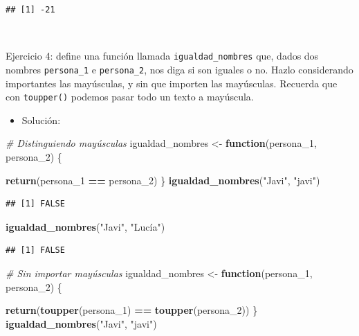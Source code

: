 \documentclass[11pt,]{book}
\newenvironment{Shaded}{\begin{snugshade}}{\end{snugshade}}
\newcommand{\CommentTok}[1]{\textcolor[rgb]{0.37,0.37,0.37}{\textit{#1}}}
\newcommand{\ControlFlowTok}[1]{\textcolor[rgb]{0.27,0.27,0.27}{\textbf{#1}}}
\newcommand{\DecValTok}[1]{\textcolor[rgb]{0.06,0.06,0.06}{#1}}
\newcommand{\KeywordTok}[1]{\textcolor[rgb]{0.27,0.27,0.27}{\textbf{#1}}}
\newcommand{\NormalTok}[1]{#1}
\newcommand{\OperatorTok}[1]{\textcolor[rgb]{0.43,0.43,0.43}{\textbf{#1}}}
\newcommand{\StringTok}[1]{\textcolor[rgb]{0.5,0.5,0.5}{#1}}
\providecommand{\tightlist}{%
  \setlength{\itemsep}{0pt}\setlength{\parskip}{0pt}}
\begin{document}
\begin{verbatim}
## [1] -21
\end{verbatim}

~

Ejercicio 4: define una función llamada \texttt{igualdad\_nombres} que, dados dos nombres \texttt{persona\_1} e \texttt{persona\_2}, nos diga si son iguales o no. Hazlo considerando importantes las mayúsculas, y sin que importen las mayúsculas. Recuerda que con \texttt{toupper()} podemos pasar todo un texto a mayúscula.

\begin{itemize}
\tightlist
\item
  Solución:
\end{itemize}

\begin{Shaded}
\begin{Highlighting}[]
\CommentTok{# Distinguiendo mayúsculas}
\NormalTok{igualdad_nombres <-}\StringTok{ }\ControlFlowTok{function}\NormalTok{(persona_}\DecValTok{1}\NormalTok{, persona_}\DecValTok{2}\NormalTok{) \{}
  
  \KeywordTok{return}\NormalTok{(persona_}\DecValTok{1} \OperatorTok{==}\StringTok{ }\NormalTok{persona_}\DecValTok{2}\NormalTok{)}
\NormalTok{\}}
\KeywordTok{igualdad_nombres}\NormalTok{(}\StringTok{"Javi"}\NormalTok{, }\StringTok{"javi"}\NormalTok{)}
\end{Highlighting}
\end{Shaded}

\begin{verbatim}
## [1] FALSE
\end{verbatim}

\begin{Shaded}
\begin{Highlighting}[]
\KeywordTok{igualdad_nombres}\NormalTok{(}\StringTok{"Javi"}\NormalTok{, }\StringTok{"Lucía"}\NormalTok{)}
\end{Highlighting}
\end{Shaded}

\begin{verbatim}
## [1] FALSE
\end{verbatim}

\begin{Shaded}
\begin{Highlighting}[]
\CommentTok{# Sin importar mayúsculas}
\NormalTok{igualdad_nombres <-}\StringTok{ }\ControlFlowTok{function}\NormalTok{(persona_}\DecValTok{1}\NormalTok{, persona_}\DecValTok{2}\NormalTok{) \{}
  
  \KeywordTok{return}\NormalTok{(}\KeywordTok{toupper}\NormalTok{(persona_}\DecValTok{1}\NormalTok{) }\OperatorTok{==}\StringTok{ }\KeywordTok{toupper}\NormalTok{(persona_}\DecValTok{2}\NormalTok{))}
\NormalTok{\}}
\KeywordTok{igualdad_nombres}\NormalTok{(}\StringTok{"Javi"}\NormalTok{, }\StringTok{"javi"}\NormalTok{)}
\end{Highlighting}
\end{Shaded}
\end{document}
